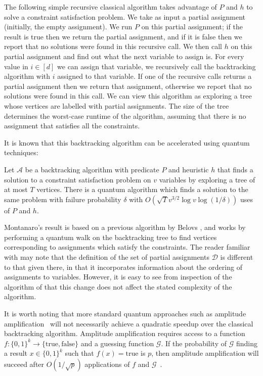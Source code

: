 The following simple recursive classical algorithm takes advantage of $P$ and $h$ to solve a constraint satisfaction problem. We take as input a partial assignment (initially, the empty assignment). We run $P$ on this partial assignment; if the result is true then we return the partial assignment, and if it is false then we report that no solutions were found in this recursive call. We then call $h$ on this partial assignment and find out what the next variable to assign is. For every value in $i \in [d]$ we can assign that variable, we recursively call the backtracking algorithm with $i$ assigned to that variable. If one of the recursive calls returns a partial assignment then we return that assignment, otherwise we report that no solutions were found in this call. We can view this algorithm as exploring a tree whose vertices are labelled with partial assignments. The size of the tree determines the worst-case runtime of the algorithm, assuming that there is no assignment that satisfies all the constraints.

It is known that this backtracking algorithm can be accelerated using quantum techniques:

\begin{theorem}
\label{thm:backtrack}
Let $\mathcal{A}$ be a backtracking algorithm with predicate $P$ and heuristic $h$ that finds a solution to a constraint satisfaction problem on $v$ variables by exploring a tree of at most $T$ vertices. There is a quantum algorithm which finds a solution to the same problem with failure probability $\delta$ with $O(\sqrt{T}v^{3/2}\log v\log(1/\delta))$ uses of $P$ and $h$.
\end{theorem}

Montanaro's result is based on a previous algorithm by Belovs \cite{belovs2013,belovs13a}, and works by performing a quantum walk on the backtracking tree to find vertices corresponding to assignments which satisfy the constraints. The reader familiar with \cite{montanaro2015} may note that the definition of the set of partial assignments $\mathcal{D}$ is different to that given there, in that it incorporates information about the ordering of assignments to variables. However, it is easy to see from inspection of the algorithm of \cite{montanaro2015} that this change does not affect the stated complexity of the algorithm.

It is worth noting that more standard quantum approaches such as amplitude amplification~\cite{brassard1997} will not necessarily achieve a quadratic speedup over the classical backtracking algorithm. Amplitude amplification requires access to a function $f:\{0,1\}^k \rightarrow \{\text{true}, \text{false}\}$ and a guessing function $\mathcal{G}$. If the probability of $\mathcal{G}$ finding a result $x \in \{0,1\}^k$ such that $f(x) = \text{true}$ is $p$, then amplitude amplification will succeed after $O(1/\sqrt{p})$ applications of $f$ and $\mathcal{G}$~\cite{brassard1997}.


